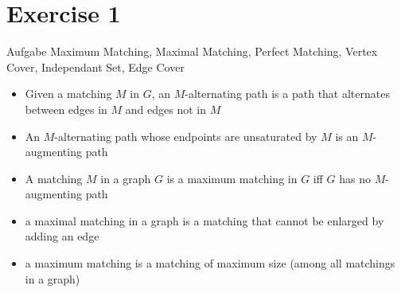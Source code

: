 
\section{Exercise 1}

\setcounter{exercise}{1}

\begin{frame}[allowframebreaks]{Aufgabe \thesection}{\scriptsize Maximum Matching, Maximal Matching, Perfect Matching, Vertex Cover, Independant Set, Edge Cover}
  \begin{solution}
  \end{solution}
  \begin{requirementsnoinc}
    \begin{itemize}
      \item Given a matching $M$ in $G$, an \alert{$M$-alternating path} is a path that alternates between edges in $M$ and edges not in $M$
      \item An $M$-alternating path whose endpoints are unsaturated by $M$ is an \alert{$M$-augmenting path}
      \item  A matching $M$ in a graph $G$ is a \alert{maximum matching} in $G$ \alert{iff} $G$ has \alert{no $M$-augmenting path}
      \item a \alert{maximal matching} in a graph is a matching that cannot be enlarged by adding an edge
      \item a \alert{maximum matching} is a matching of maximum size (among all matchings in a graph)
    \end{itemize}
  \end{requirementsnoinc}
  \begin{solution}
  \end{solution}
  \begin{solution}
  \end{solution}
  \begin{solutionnoinc}
    \begin{columns}
      \begin{column}{0.5\textwidth}
      \end{column}
      \begin{column}{0.5\textwidth}
      \end{column}
    \end{columns}

\end{solutionnoinc}
\end{frame}
